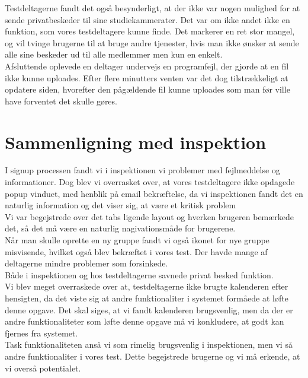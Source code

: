 \documentclass[12pt]{article}
\begin{document}
\newpage

\noindent Testdeltagerne fandt det også besynderligt, at der ikke var nogen mulighed for at sende privatbeskeder til sine studiekammerater. Det var om ikke andet ikke en funktion, som vores testdeltagere kunne finde. Det markerer en ret stor mangel, og vil tvinge brugerne til at bruge andre tjenester, hvis man ikke ønsker at sende alle sine beskeder ud til alle medlemmer men kun en enkelt.\\

\noindent Afsluttende oplevede en deltager undervejs en programfejl, der gjorde at en fil ikke kunne uploades. Efter flere minutters venten var det dog tilstrækkeligt at opdatere siden, hvorefter den pågældende fil kunne uploades som man før ville have forventet det skulle gøres.
\section{Sammenligning med inspektion}

I signup processen fandt vi i inspektionen vi problemer med fejlmeddelse og informationer. Dog blev vi overrasket over, at vores testdeltagere ikke opdagede popup vinduet, med henblik på email bekræftelse, da vi inspektionen fandt det en naturlig information og det viser sig, at være et kritisk problem \\

Vi var begejstrede over det tabs ligende layout og hverken brugeren bemærkede det, så det må være en naturlig nagivationsmåde for brugerene.\\

Når man skulle oprette en ny gruppe fandt vi også ikonet for nye gruppe misvisende, hvilket også blev bekræftet i vores test. Der havde mange af deltagerne mindre problemer som forsinkede.\\
Både i inspektionen og hos testdeltagerne savnede privat besked funktion. \\

Vi blev meget overraskede over at, testdeltagerne ikke brugte kalenderen efter hensigten, da det viste sig at andre funktionaliter i systemet formåede at løfte denne opgave. Det skal siges, at vi fandt kalenderen brugsvenlig, men da der er andre funktionaliteter som løfte denne opgave må vi konkludere, at godt kan fjernes fra systemet.\\

Task funktionaliteten anså vi som rimelig brugsvenlig i inspektionen, men vi så andre funktionaliter i vores test. Dette begejstrede brugerne og vi må erkende, at vi overså potentialet. \\
\end{document}
